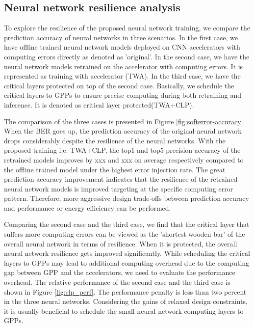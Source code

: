 \subsection{Neural network resilience analysis}
To explore the resilience of the proposed neural network training, we
compare the prediction accuracy of neural networks in three scenarios.
In the first case, we have offline trained neural network models deployed on 
CNN accelerators with computing errors directly as denoted as 'original'.
In the second case, we have the neural network models retrained on the 
accelerator with computing errors. It is represented as training with 
accelerator (TWA). In the third case, we have the critical layers 
protected on top of the second case. Basically, we schedule the critical layers to 
GPPs to ensure precise computing during both retraining and inference.
It is denoted as critical layer protected(TWA+CLP).

The comparison of the three cases is presented in Figure \ref{fig:softerror-accuracy}.
When the BER goes up, the prediction accuracy of the original neural network drops 
considerably despite the resilience of the neural networks. 
With the proposed training i.e. TWA+CLP, the top1 and top5 precision accuracy 
of the retrained models improves by xxx and xxx on average respectively 
compared to the offline trained model under the highest error injection rate. 
The great prediction accuracy improvement indicates that the resilience 
of the retrained neural network models is improved targeting at the 
specific computing error pattern. Therefore, more aggressive design trade-offs 
between prediction accuracy and performance or energy efficiency can be performed. 

Comparing the second case and the third case, we find that the critical layer 
that suffers more computing errors can be viewed as the 'shortest 
wooden bar' of the overall neural network in terms of resilience. When it is protected, 
the overall neural network resilience gets improved significantly.
While scheduling the critical layers to GPPs may lead to additional computing overhead 
due to the computing gap between GPP and the accelerators, we need to evaluate the 
performance overhead. The relative performance of the second case and the third case 
is shown in Figure \ref{fig:clp_perf}. The performance penalty is less than two percent 
in the three neural networks. Considering the gains of relaxed design constraints, 
it is usually beneficial to schedule the small neural network computing layers to GPPs. 

